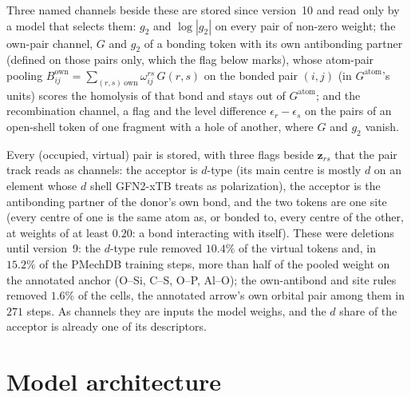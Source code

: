 \documentclass[11pt,a4paper]{article}
\newcommand{\vb}[1]{\bm{#1}}
\begin{document}
Three named channels beside these are stored since version~10 and read only by a model that selects them: $g_2$ and $\log|g_2|$ on every pair of non-zero weight; the own-pair channel, $G$ and $g_2$ of a bonding token with its own antibonding partner (defined on those pairs only, which the flag below marks), whose atom-pair pooling $B^{\mathrm{own}}_{ij}=\sum_{(r,s)\ \mathrm{own}}\omega^{rs}_{ij}\,G(r,s)$ on the bonded pair $(i,j)$ (in $G^{\mathrm{atom}}$'s units) scores the homolysis of that bond and stays out of $G^{\mathrm{atom}}$; and the recombination channel, a flag and the level difference $\epsilon_r-\epsilon_s$ on the pairs of an open-shell token of one fragment with a hole of another, where $G$ and $g_2$ vanish.

Every (occupied, virtual) pair is stored, with three flags beside $\vb{z}_{rs}$ that the pair track reads as channels: the acceptor is $d$-type (its main centre is mostly $d$ on an element whose $d$ shell GFN2-xTB treats as polarization), the acceptor is the antibonding partner of the donor's own bond, and the two tokens are one site (every centre of one is the same atom as, or bonded to, every centre of the other, at weights of at least $0.20$: a bond interacting with itself). These were deletions until version~9: the $d$-type rule removed $10.4\%$ of the virtual tokens and, in $15.2\%$ of the PMechDB training steps, more than half of the pooled weight on the annotated anchor (O--Si, C--S, O--P, Al--O); the own-antibond and site rules removed $1.6\%$ of the cells, the annotated arrow's own orbital pair among them in $271$ steps. As channels they are inputs the model weighs, and the $d$ share of the acceptor is already one of its descriptors.

\section{Model architecture}
\label{sec:model}
\end{document}
